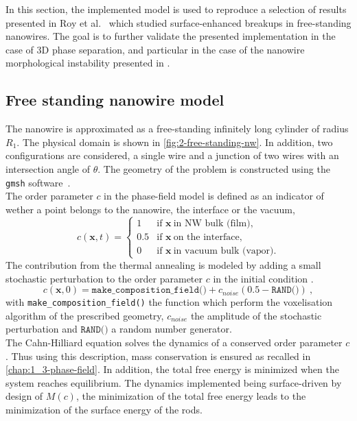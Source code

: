In this section, the implemented model is used to reproduce a selection of results presented in Roy et al.\ \cite{RoyVarmaGururajan2021} which studied surface-enhanced breakups in free-standing nanowires. The goal is to further validate the presented implementation in the case of 3D phase separation, and particular in the case of the nanowire morphological instability presented in \cite{RoyVarmaGururajan2021}.
\subsection{Free standing nanowire model}
    The nanowire is approximated as a free-standing infinitely long cylinder of radius $R_1$. The physical domain is shown in \autoref{fig:2-free-standing-nw}. In addition, two configurations are considered, a single wire and a junction of two wires with an intersection angle of $\theta$. The geometry of the problem is constructed using the \texttt{gmsh} software\ \cite{GeuzaineRemacle}.\\
    The order parameter $c$ in the phase-field model is defined as an indicator of wether a point belongs to the nanowire, the interface or the vacuum,
    \begin{equation}
        c(\mathbf{x}, t) = \begin{cases}
            1 & \text{if } \mathbf{x}\ \text{in NW bulk (film)}, \\
            0.5 & \text{if } \mathbf{x}\ \text{on the interface}, \\
            0 & \text{if } \mathbf{x}\ \text{in vacuum bulk (vapor)}.
        \end{cases}
    \end{equation}
    The contribution from the thermal annealing is modeled by adding a small stochastic perturbation to the order parameter $c$ in the initial condition \cite{BallFinkBowler2003}.
    \begin{equation}\label{eq:2-c_t}
        c(\mathbf{x}, 0) = \texttt{make\_composition\_field()} + c_{noise}(0.5-\texttt{RAND()})\ ,
    \end{equation}
    with \texttt{make\_composition\_field()} the function which perform the voxelisation algorithm of the prescribed geometry, $c_{noise}$ the amplitude of the stochastic perturbation and $\texttt{RAND()}$ a random number generator.\\
    The Cahn-Hilliard equation solves the dynamics of a conserved order parameter $c$. Thus using this description, mass conservation is ensured as recalled in \autoref{chap:1_3-phase-field}. In addition, the total free energy is minimized when the system reaches equilibrium. The dynamics implemented being surface-driven by design of $M(c)$, the minimization of the total free energy leads to the minimization of the surface energy of the rods.\\
